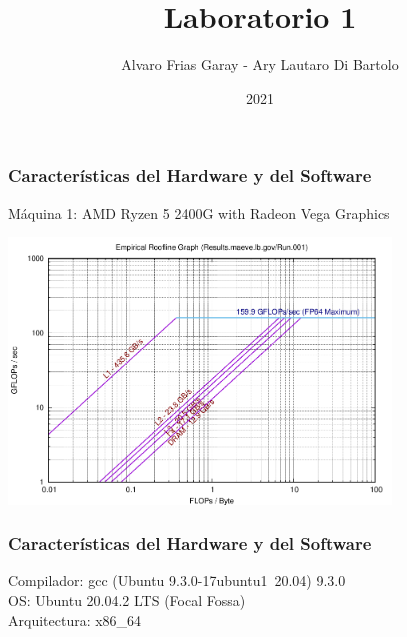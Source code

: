 \documentclass{beamer}
\title{Laboratorio 1}
\author{Alvaro Frias Garay - Ary Lautaro Di Bartolo}
\institute{Universidad Nacional de Córdoba - Universidad de Lautaro}
\date{2021}
\begin{document}
\frame{\titlepage}


\begin{frame}
    \frametitle{Características del Hardware y del Software}
    Máquina 1: AMD Ryzen 5 2400G with Radeon Vega Graphics

    \includegraphics[width=4in]{./imagenes/RTK_ALVARO.png}


\end{frame}

\begin{frame}
    \frametitle{Características del Hardware y del Software}
    Compilador: gcc (Ubuntu 9.3.0-17ubuntu1~20.04) 9.3.0 \\
    OS: Ubuntu 20.04.2 LTS (Focal Fossa) \\
    Arquitectura: x86\_64
\end{frame}
\end{document}
